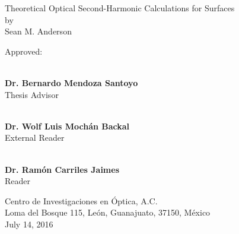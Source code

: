 \begin{titlingpage*}

\begin{center}
    \vspace*{1cm}
    {\LARGE Theoretical Optical Second-Harmonic Calculations for Surfaces}\\
    \vspace{0.7cm}
    {\large by}\\
    \vspace{0.7cm}
    {\Large Sean M. Anderson}
\end{center}

\vfill
{\Large Approved:}

\begin{flushright}

\vspace*{1cm}

\makebox[0.5\textwidth ]{\hrulefill}\\
\textbf{Dr. Bernardo Mendoza Santoyo}\\ Thesis Advisor
\vspace{1.25cm}

\makebox[0.5\textwidth ]{\hrulefill}\\
\textbf{Dr. Wolf Luis Moch\'an Backal}\\ External Reader
\vspace{1.25cm}

\makebox[0.5\textwidth ]{\hrulefill}\\
\textbf{Dr. Ram\'on Carriles Jaimes}\\ Reader
\vfill

\end{flushright}

\begin{center}
    {\large 
    Centro de Investigaciones en \'Optica, A.C.\\
    Loma del Bosque 115, Le\'on, Guanajuato, 37150, M\'exico\\
    July 14, 2016
    }
\end{center}

\end{titlingpage*}
